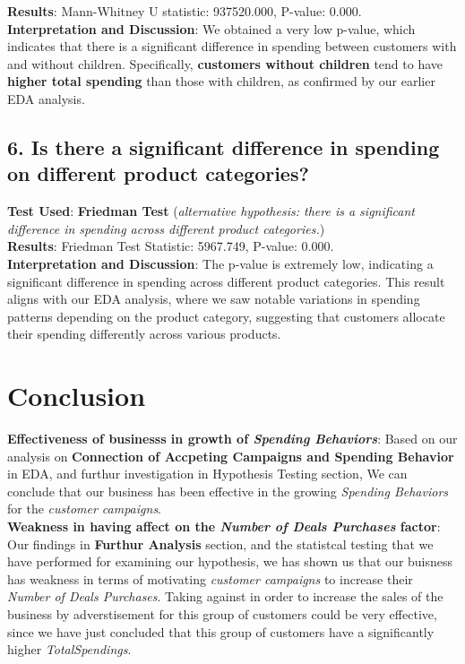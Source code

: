 \documentclass[a4paper,12pt]{article}
\begin{document}
\noindent \textbf{Results}: Mann-Whitney U statistic: 937520.000, P-value: 0.000. \\ 

\noindent \textbf{Interpretation and Discussion}: We obtained a very low p-value, which indicates that there is a significant difference in spending between customers with and without children. Specifically, \textbf{customers without children} tend to have \textbf{higher total spending} than those with children, as confirmed by our earlier EDA analysis.

\subsection*{6. Is there a significant difference in spending on different product categories?}
\noindent \textbf{Test Used}: \textbf{Friedman Test} (\textit{alternative hypothesis: there is a significant difference in spending across different product categories.})\\ 

\noindent \textbf{Results}: Friedman Test Statistic: 5967.749, P-value: 0.000. \\ 

\noindent \textbf{Interpretation and Discussion}: The p-value is extremely low, indicating a significant difference in spending across different product categories. This result aligns with our EDA analysis, where we saw notable variations in spending patterns depending on the product category, suggesting that customers allocate their spending differently across various products.


\section*{Conclusion}
\noindent \textbf{Effectiveness of businesss in growth of \textit{Spending Behaviors}}: Based on our analysis on \textbf{Connection of Accpeting Campaigns and Spending Behavior} in EDA, and furthur 
investigation in Hypothesis Testing section, We can conclude that our business has been effective in the growing \textit{Spending Behaviors} for the \textit{customer campaigns}. \\ 

\noindent \textbf{Weakness in having affect on the \textit{Number of Deals Purchases} factor}: Our findings in \textbf{Furthur Analysis} section, and the statistcal testing that we have performed for examining our hypothesis, 
we has shown us that our buisness has weakness in terms of motivating \textit{customer campaigns} to increase their \textit{Number of Deals Purchases}. Taking against in order to increase the sales of the business by adverstisement for this group of customers could be very effective, 
since we have just concluded that this group of customers have a significantly higher \textit{TotalSpendings}. \\ 
\end{document}
